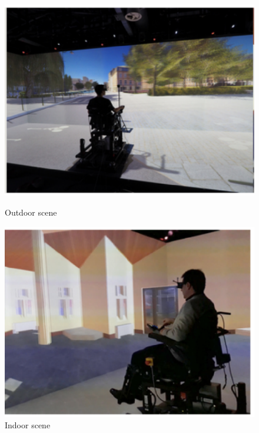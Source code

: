 \begin{figure}[!h]
\center
\begin{minipage}{0.495\linewidth}
\center
\captionsetup{justification=centering,margin=0.5cm,font=small}
\includegraphics[width=0.95\linewidth]{img/cap3/vailland2019-3dScenes01}
\caption{ Outdoor scene \cite{vailland2019}} \label{subfig:vailland2019-3dScenes01}
\end{minipage}
\begin{minipage}{0.495\linewidth}
\center
\captionsetup{justification=centering,margin=0cm,font=small}
\includegraphics[width=0.95\linewidth]{img/cap3/vailland2019-3dScenes02}
\caption{ Indoor scene \cite{vailland2019}} \label{subfig:vailland2019-3dScenes02}
\end{minipage}
\end{figure}

